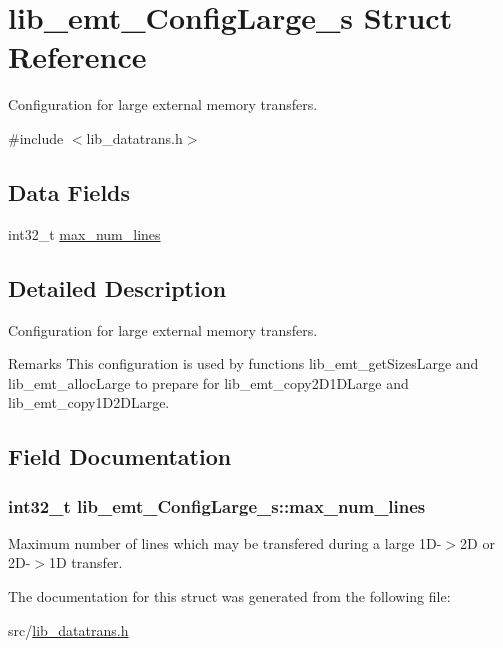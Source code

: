\hypertarget{structlib__emt__ConfigLarge__s}{}\section{lib\+\_\+emt\+\_\+\+Config\+Large\+\_\+s Struct Reference}
\label{structlib__emt__ConfigLarge__s}


Configuration for large external memory transfers.  




{\ttfamily \#include $<$lib\+\_\+datatrans.\+h$>$}

\subsection*{Data Fields}
\begin{DoxyCompactItemize}
\item 
int32\+\_\+t \hyperlink{structlib__emt__ConfigLarge__s_a0663257ebd151a0deda386e4b3a3bf48}{max\+\_\+num\+\_\+lines}
\end{DoxyCompactItemize}


\subsection{Detailed Description}
Configuration for large external memory transfers. 

\begin{DoxyRemark}{Remarks}
This configuration is used by functions lib\+\_\+emt\+\_\+get\+Sizes\+Large and lib\+\_\+emt\+\_\+alloc\+Large to prepare for lib\+\_\+emt\+\_\+copy2\+D1\+D\+Large and lib\+\_\+emt\+\_\+copy1\+D2\+D\+Large. 
\end{DoxyRemark}


\subsection{Field Documentation}
\hypertarget{structlib__emt__ConfigLarge__s_a0663257ebd151a0deda386e4b3a3bf48}{}
\subsubsection[{max\+\_\+num\+\_\+lines}]{\setlength{\rightskip}{0pt plus 5cm}int32\+\_\+t lib\+\_\+emt\+\_\+\+Config\+Large\+\_\+s\+::max\+\_\+num\+\_\+lines}\label{structlib__emt__ConfigLarge__s_a0663257ebd151a0deda386e4b3a3bf48}
Maximum number of lines which may be transfered during a large 1\+D-\/$>$2\+D or 2\+D-\/$>$1\+D transfer. 

The documentation for this struct was generated from the following file\+:\begin{DoxyCompactItemize}
\item 
src/\hyperlink{lib__datatrans_8h}{lib\+\_\+datatrans.\+h}\end{DoxyCompactItemize}
